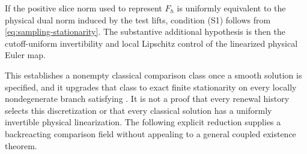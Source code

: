 \documentclass[11pt]{article}
\numberwithin{equation}{section}
\theoremstyle{definition}
\theoremstyle{remark}
\begin{document}
If the positive slice norm used to represent $F_h$ is uniformly equivalent to the physical dual norm induced by the test lifts, condition (S1) follows from \eqref{eq:sampling-stationarity}.  The substantive additional hypothesis is then the cutoff-uniform invertibility and local Lipschitz control of the linearized physical Euler map.

This establishes a nonempty classical comparison class once a smooth solution is specified, and it upgrades that class to exact finite stationarity on every locally nondegenerate branch satisfying .  It is not a proof that every renewal history selects this discretization or that every classical solution has a uniformly invertible physical linearization.  The following explicit reduction supplies a backreacting comparison field without appealing to a general coupled existence theorem.
\end{document}
